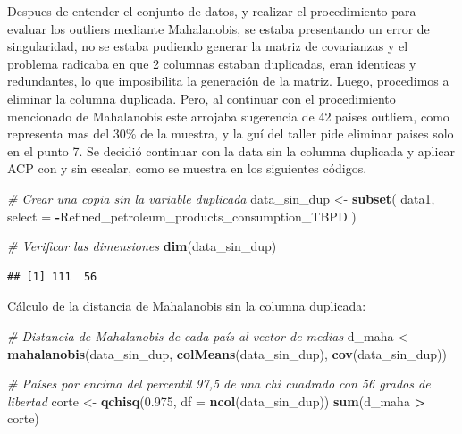 \documentclass[
]{article}
\newenvironment{Shaded}{\begin{snugshade}}{\end{snugshade}}
\newcommand{\AttributeTok}[1]{\textcolor[rgb]{0.13,0.29,0.53}{#1}}
\newcommand{\CommentTok}[1]{\textcolor[rgb]{0.56,0.35,0.01}{\textit{#1}}}
\newcommand{\FloatTok}[1]{\textcolor[rgb]{0.00,0.00,0.81}{#1}}
\newcommand{\FunctionTok}[1]{\textcolor[rgb]{0.13,0.29,0.53}{\textbf{#1}}}
\newcommand{\NormalTok}[1]{#1}
\newcommand{\OtherTok}[1]{\textcolor[rgb]{0.56,0.35,0.01}{#1}}
\newcommand{\SpecialCharTok}[1]{\textcolor[rgb]{0.81,0.36,0.00}{\textbf{#1}}}
\begin{document}
Despues de entender el conjunto de datos, y realizar el procedimiento
para evaluar los outliers mediante Mahalanobis, se estaba presentando un
error de singularidad, no se estaba pudiendo generar la matriz de
covarianzas y el problema radicaba en que 2 columnas estaban duplicadas,
eran identicas y redundantes, lo que imposibilita la generación de la
matriz. Luego, procedimos a eliminar la columna duplicada. Pero, al
continuar con el procedimiento mencionado de Mahalanobis este arrojaba
sugerencia de 42 paises outliera, como representa mas del 30\% de la
muestra, y la guí del taller pide eliminar paises solo en el punto 7. Se
decidió continuar con la data sin la columna duplicada y aplicar ACP con
y sin escalar, como se muestra en los siguientes códigos.

\begin{Shaded}
\begin{Highlighting}[]
\CommentTok{\# Crear una copia sin la variable duplicada}
\NormalTok{data\_sin\_dup }\OtherTok{\textless{}{-}} \FunctionTok{subset}\NormalTok{(}
\NormalTok{  data1,}
  \AttributeTok{select =} \SpecialCharTok{{-}}\NormalTok{Refined\_petroleum\_products\_consumption\_TBPD}
\NormalTok{)}

\CommentTok{\# Verificar las dimensiones}
\FunctionTok{dim}\NormalTok{(data\_sin\_dup)}
\end{Highlighting}
\end{Shaded}

\begin{verbatim}
## [1] 111  56
\end{verbatim}

Cálculo de la distancia de Mahalanobis sin la columna duplicada:

\begin{Shaded}
\begin{Highlighting}[]
\CommentTok{\# Distancia de Mahalanobis de cada país al vector de medias}
\NormalTok{d\_maha }\OtherTok{\textless{}{-}} \FunctionTok{mahalanobis}\NormalTok{(data\_sin\_dup, }\FunctionTok{colMeans}\NormalTok{(data\_sin\_dup), }\FunctionTok{cov}\NormalTok{(data\_sin\_dup))}

\CommentTok{\# Países por encima del percentil 97,5 de una chi cuadrado con 56 grados de libertad}
\NormalTok{corte }\OtherTok{\textless{}{-}} \FunctionTok{qchisq}\NormalTok{(}\FloatTok{0.975}\NormalTok{, }\AttributeTok{df =} \FunctionTok{ncol}\NormalTok{(data\_sin\_dup))}
\FunctionTok{sum}\NormalTok{(d\_maha }\SpecialCharTok{\textgreater{}}\NormalTok{ corte)}
\end{Highlighting}
\end{Shaded}
\end{document}

